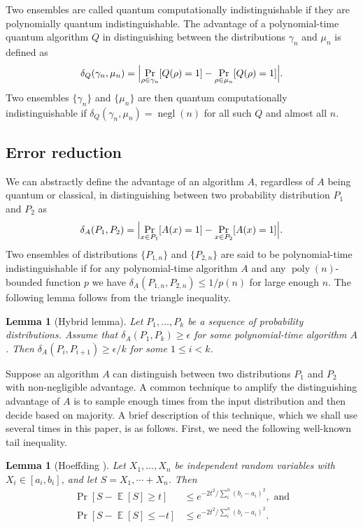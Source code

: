 \documentclass[11pt]{article}
\theoremstyle{plain}
\newtheorem{lemma}[theorem]{Lemma}
\theoremstyle{definition}
\DeclareMathOperator{\negl}{negl} %
\DeclareMathOperator{\poly}{poly}
\DeclareMathOperator{\E}{\mathbb{E}}
\DeclarePairedDelimiter{\abs}{\lvert}{\rvert}
\begin{document}
Two ensembles are called quantum computationally indistinguishable if they are polynomially quantum indistinguishable. The advantage of a polynomial-time quantum algorithm $Q$ in distinguishing between the distributions $\gamma_n$ and $\mu_n$ is defined as
\[ \delta_Q(\gamma_n, \mu_n) = \abs[\Big]{ \Pr_{\rho \in \gamma_n}[Q(\rho) = 1] - \Pr_{\rho \in \mu_n}[Q(\rho) = 1] }. \]
Two ensembles $\{ \gamma_n \}$ and $\{ \mu_n \}$ are then quantum computationally indistinguishable if $\delta_Q(\gamma_n, \mu_n) = \negl(n)$ for all such $Q$ and almost all $n$. 




\subsection{Error reduction}
\label{sec:err-red}

We can abstractly define the advantage of an algorithm $A$, regardless of $A$ being quantum or classical, in distinguishing between two probability distribution $P_1$ and $P_2$ as
\[ \delta_A(P_1, P_2) = \abs[\Big]{ \Pr_{x \in P_1}[A(x) = 1] - \Pr_{x \in P_2}[A(x) = 1] }. \]
Two ensembles of distributions $\{ P_{1, n} \}$ and $\{ P_{2, n} \}$ are said to be polynomial-time indistinguishable if for any polynomial-time algorithm $A$ and any $\poly(n)$-bounded function $p$ we have $\delta_A(P_{1, n}, P_{2, n}) \le 1 / p(n)$ for large enough $n$. The following lemma follows from the triangle inequality.

\begin{lemma}[Hybrid lemma]
    \label{lem:hybrid}
    Let $P_1, \dots, P_k$ be a sequence of probability distributions. Assume that $\delta_A(P_1, P_k) \ge \epsilon$ for some polynomial-time algorithm $A$. Then $\delta_A(P_i, P_{i + 1}) \ge \epsilon / k$ for some $1 \le i < k$.
\end{lemma}

Suppose an algorithm $A$ can distinguish between two distributions $P_1$ and $P_2$ with non-negligible advantage. A common technique to amplify the distinguishing advantage of $A$ is to sample enough times from the input distribution and then decide based on majority. A brief description of this technique, which we shall use several times in this paper, is as follows. First, we need the following well-known tail inequality.

\begin{lemma}[Hoeffding \cite{hoeffding1963probability}]
    \label{lem:hoeffding}
    Let $X_1, \dots, X_n$ be independent random variables with $X_i \in [a_i, b_i]$, and let $S = X_1, \cdots + X_n$. Then
    \begin{align*}
        \Pr[S - \E[S] \ge t] & \le e^{-2t^2 / \sum_i^n (b_i - a_i)^2}, \text{ and} \\
        \Pr[S - \E[S] \le -t] & \le e^{-2t^2 / \sum_i^n (b_i - a_i)^2}.
    \end{align*}
\end{lemma}
\end{document}
